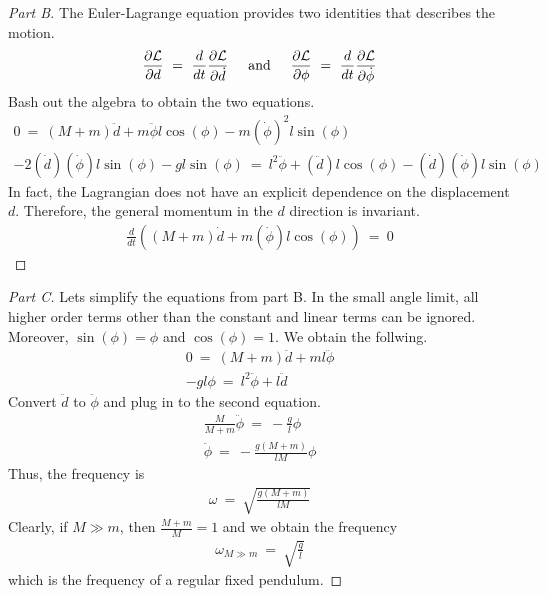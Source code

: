 \documentclass{article}
\numberwithin{equation}{section}
\newcommand{\textAnd}{
    {
        \hspace{5mm}
        \textrm{and}
        \hspace{5mm}
    }
}
\newcommand{\deriv}[2]{
\frac {d {#1} } {d {#2}}
}
\newcommand{\pderiv}[2]{
\frac {\partial {#1} } {\partial {#2}}
}
\begin{document}
\begin{proof}[Part B] The Euler-Lagrange equation provides two identities 
    that describes the motion. 
    \begin{align}
        \pderiv{\mathcal L}{ d} \ = \ \deriv{}{t} \pderiv{\mathcal L}{\dot d} \textAnd 
        \pderiv{\mathcal L}{\phi} \ = \ \deriv{}{t} \pderiv{\mathcal L}{\dot \phi}
    \end{align}
    Bash out the algebra to obtain the two equations. 
    \begin{align}
        0 \ =\ (M + m) \ddot d + m \ddot \phi l \cos(\phi) - m (\dot \phi)^2 l \sin(\phi) \\ 
        -2(\dot d) (\dot \phi) l \sin(\phi) - gl\sin(\phi) \ = \ 
        l^2 \ddot \phi + (\ddot d) l \cos(\phi) - (\dot d) (\dot \phi) l \sin(\phi)
    \end{align}
    In fact, the Lagrangian does not have an explicit dependence on 
    the displacement $d$. Therefore, the general momentum in 
    the $d$ direction is invariant.
    \begin{align}
        \deriv{}{t} \left(
            (M + m) \dot d + m (\dot \phi) l \cos(\phi)
        \right) \ = \ 0
    \end{align}
\end{proof}

\begin{proof}
    [Part C] Lets simplify the equations from part B. In the small 
    angle limit, all higher order terms other than the constant and 
    linear terms can be ignored. Moreover, $\sin(\phi) = \phi$ and $\cos(\phi) = 1$. 
    We obtain the follwing. 
    \begin{align}
        0 \ = \ (M + m) \ddot d + m l \ddot \phi \\ 
        -gl \phi \ = \ l^2 \ddot \phi +  l \ddot d 
    \end{align}
    Convert $\ddot d$ to $\ddot \phi$ and plug in to the second equation. 
    \begin{align}
        \frac M {M + m} \ddot \phi \ = \ - \frac g l \phi \\ 
        \ddot\phi \ = \ - \frac {g (M + m)}{lM} \phi
    \end{align}
    Thus, the frequency is 
    \begin{align}
        \omega \ = \ \sqrt{\frac {g (M + m)}{lM}}
    \end{align}
    Clearly, if $M \gg m$, then $\frac {M + m} M = 1$ and we obtain 
    the frequency 
    \begin{align}
        \omega_{M\gg m} \ = \ \sqrt{\frac g l}
    \end{align}
    which is the frequency of a regular fixed pendulum. 
\end{proof}
\end{document}

